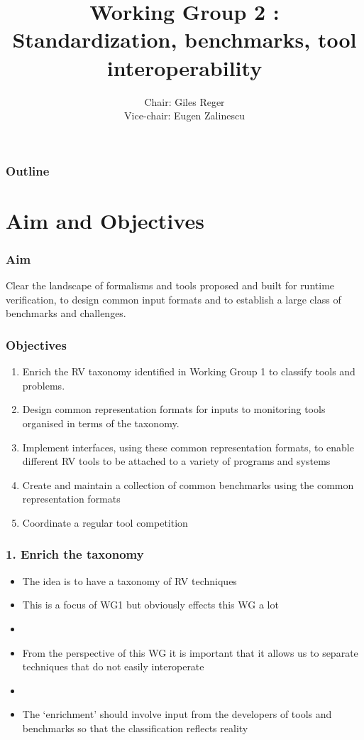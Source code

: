 \documentclass{beamer}
\title[WG2]{Working Group 2 : Standardization, benchmarks, tool interoperability}
\author{Chair: Giles Reger\\ Vice-chair: Eugen Zalinescu}
\begin{document}
\begin{frame}
  \titlepage
\end{frame}

\begin{frame}
  \frametitle{Outline}
  \tableofcontents  
\end{frame}

\section{Aim and Objectives}

\begin{frame}
\frametitle{Aim}
\Large
Clear the landscape of formalisms and tools proposed and built for runtime verification, to design common input formats and to establish a large class of benchmarks and challenges.
\end{frame}

\begin{frame}
\frametitle{Objectives}
\begin{enumerate}
	\item Enrich the RV taxonomy identified in Working Group 1 to classify tools and problems.
	\item Design common representation formats for inputs to monitoring tools organised in terms of the taxonomy.
	\item Implement interfaces, using these common representation formats, to enable different RV tools to be attached to a variety of programs and systems
	\item Create and maintain a collection of common benchmarks using the common representation formats
	\item Coordinate a regular tool competition 
\end{enumerate}
\end{frame}

\begin{frame}
\frametitle{1. Enrich the taxonomy}
\begin{itemize}
	\item The idea is to have a taxonomy of RV techniques
	\item This is a focus of WG1 but obviously effects this WG a lot
	\item[]
	\item From the perspective of this WG it is important that it allows us to separate techniques that do not easily interoperate
	\item[]
	\item The `enrichment' should involve input from the developers of tools and benchmarks so that the classification reflects reality
\end{itemize}
\end{frame}
\end{document}
